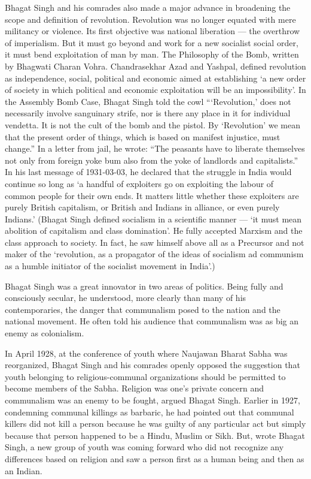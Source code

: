 \begin{multicols}{2}
Bhagat Singh and his comrades also made a major advance in broadening the scope and definition of revolution. Revolution was no longer equated with mere militancy or violence. Its first objective was national liberation --- the overthrow of imperialism. But it must go beyond and work for a new socialist social order, it must bend exploitation of man by man. The Philosophy of the Bomb, written by Bhagwati Charan Vohra. Chandrasekhar Azad and Yashpal, defined revolution as independence, social, political and economic aimed at establishing `a new order of society in which political and economic exploitation will be an impossibility'. In the Assembly Bomb Case, Bhagat Singh told the cowl ```Revolution,' does not necessarily involve sanguinary strife, nor is there any place in it for individual vendetta. It is not the cult of the bomb and the pistol. By `Revolution' we mean that the present order of things, which is based on manifest injustice, must change.'' In a letter from jail, he wrote: ``The peasants have to liberate themselves not only from foreign yoke bum also from the yoke of landlords and capitalists.'' In his last message of 1931-03-03, he declared that the struggle in India would continue so long as `a handful of exploiters go on exploiting the labour of common people for their own ends. It matters little whether these exploiters are purely British capitalism, or British and Indians in alliance, or even purely Indians.' (Bhagat Singh defined socialism in a scientific manner --- `it must mean abolition of capitalism and class domination'. He fully accepted Marxism and the class approach to society. In fact, he saw himself above all as a Precursor and not maker of the `revolution, as a propagator of the ideas of socialism ad communism as a humble initiator of the socialist movement in India'.)

Bhagat Singh was a great innovator in two areas of politics. Being fully and consciously secular, he understood, more clearly than many of his contemporaries, the danger that communalism posed to the nation and the national movement. He often told his audience that communalism was as big an enemy as colonialism.

In April 1928, at the conference of youth where Naujawan Bharat Sabha was reorganized, Bhagat Singh and his comrades openly opposed the suggestion that youth belonging to religious-communal organizations should be permitted to become members of the Sabha. Religion was one's private concern and communalism was an enemy to be fought, argued Bhagat Singh. Earlier in 1927, condemning communal killings as barbaric, he had pointed out that communal killers did not kill a person because he was guilty of any particular act but simply because that person happened to be a Hindu, Muslim or Sikh. But, wrote Bhagat Singh, a new group of youth was coming forward who did not recognize any differences based on religion and saw a person first as a human being and then as an Indian.


\end{multicols}
